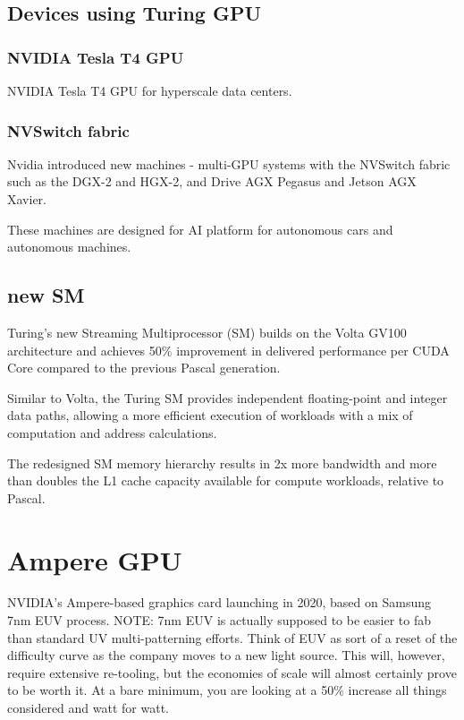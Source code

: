 \section{Devices using Turing GPU}
\subsection{NVIDIA Tesla T4 GPU}

NVIDIA Tesla T4 GPU for hyperscale data centers.

\subsection{NVSwitch fabric}

Nvidia introduced new machines - multi-GPU systems with the NVSwitch fabric such
as the DGX-2 and HGX-2, and Drive AGX Pegasus and Jetson AGX Xavier.

These machines are designed for AI platform for autonomous cars and autonomous machines.


\section{new SM}
\label{sec:SM-Turing}

Turing’s new Streaming Multiprocessor (SM) builds on the Volta GV100
architecture and achieves 50\% improvement in delivered performance per CUDA
Core compared to the previous Pascal generation.

Similar to Volta, the Turing SM provides independent floating-point and integer
data paths, allowing a more efficient execution of workloads with a mix of
computation and address calculations.

The redesigned SM memory hierarchy results in 2x more bandwidth and more than
doubles the L1 cache capacity available for compute workloads, relative to
Pascal.



\chapter{Ampere GPU}
\label{chap:Ampere-GPU}

NVIDIA’s Ampere-based graphics card launching in 2020, based on Samsung 7nm EUV
process.
NOTE: 7nm EUV is actually supposed to be easier to fab than standard UV
multi-patterning efforts.
Think of EUV as sort of a reset of the difficulty curve as the company moves to
a new light source. This will, however, require extensive re-tooling, but the
economies of scale will almost certainly prove to be worth it. At a bare
minimum, you are looking at a 50\% increase all things considered and watt for
watt.

